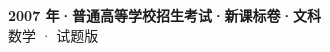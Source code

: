 \documentclass[zihao=-4, a4paper]{ctexart}
\begin{document}
\begin{center}
  {\Large\bfseries 2007 年·普通高等学校招生考试·新课标卷·文科}\\[4pt]
  {\large 数学 · 试题版}
\end{center}
\medskip
{}

\end{document}

